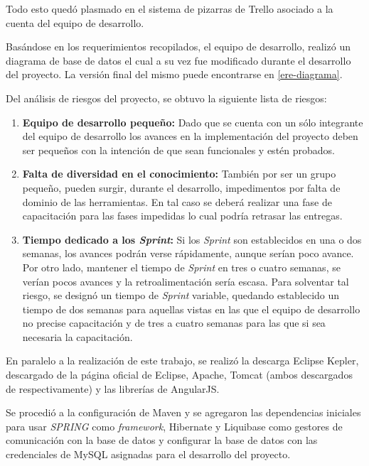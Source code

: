     Todo esto quedó plasmado en el sistema de pizarras de Trello asociado a la cuenta del equipo de desarrollo.
    
    Basándose en los requerimientos recopilados, el equipo de desarrollo, realizó un diagrama de base de datos el cual a su vez fue modificado durante el desarrollo del proyecto. La versión final del mismo puede encontrarse en \ref{ere-diagrama}.
    
    Del análisis de riesgos del proyecto, se obtuvo la siguiente lista de riesgos:
    
    \begin{enumerate}
        \item \textbf{Equipo de desarrollo pequeño:} Dado que se cuenta con un sólo integrante del equipo de desarrollo los avances en la implementación del proyecto deben ser pequeños con la intención de que sean funcionales y estén probados.
        \item \textbf{Falta de diversidad en el conocimiento:} También por ser un grupo pequeño, pueden surgir, durante el desarrollo, impedimentos por falta de dominio de las herramientas. En tal caso se deberá realizar una fase de capacitación para las fases impedidas lo cual podría retrasar las entregas.
        \item \textbf{Tiempo dedicado a los \textit{Sprint}:} Si los \textit{Sprint} son establecidos en una o dos semanas, los avances podrán verse rápidamente, aunque serían poco avance. Por otro lado, mantener el tiempo de \textit{Sprint} en tres o cuatro semanas, se verían pocos avances y la retroalimentación sería escasa. Para solventar tal riesgo, se designó un tiempo de \textit{Sprint} variable, quedando establecido un tiempo de dos semanas para aquellas vistas en las que el equipo de desarrollo no precise capacitación y de tres a cuatro semanas para las que si sea necesaria la capacitación.
    \end{enumerate}
    
    En paralelo a la realización de este trabajo, se realizó la descarga Eclipse Kepler, descargado de la página oficial de Eclipse\cite{ECLIPSE-eclipseorg}, Apache, Tomcat (ambos descargados de \cites{APACHE-maven}{APACHE-tomcat} respectivamente) y las librerías de AngularJS.
    
    Se procedió a la configuración de Maven y se agregaron las dependencias iniciales para usar \textit{SPRING} como \textit{framework}, Hibernate y Liquibase como gestores de comunicación con la base de datos y configurar la base de datos con las credenciales de MySQL asignadas para el desarrollo del proyecto.
    
